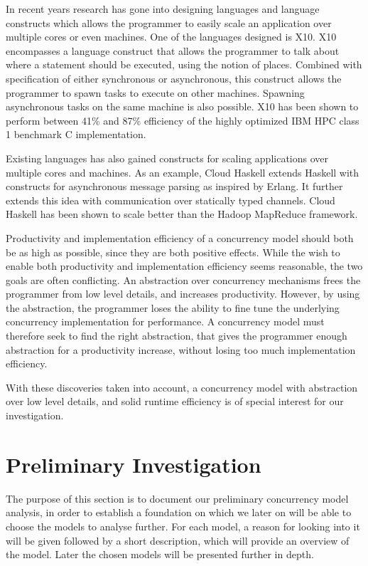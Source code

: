 In recent years research has gone into designing languages and language constructs which allows the programmer to easily scale an application over multiple cores or even machines. One of the languages designed is X10\cite{charles2005x10}. X10 encompasses a language construct that allows the programmer to talk about where a statement should be executed, using the notion of places\cite[p. 54]{tardieu2014x10}. Combined with specification of either synchronous or asynchronous, this construct allows the programmer to spawn tasks to execute on other machines. Spawning asynchronous tasks on the same machine is also possible\cite[p. 55]{tardieu2014x10}. X10 has been shown to perform between 41\% and 87\% efficiency of the highly optimized IBM HPC class 1 benchmark C implementation\cite[p. 62]{tardieu2014x10}.

Existing languages has also gained constructs for scaling applications over multiple cores and machines.  As an example, Cloud Haskell extends Haskell with constructs for asynchronous message parsing as inspired by Erlang\cite[p. 119]{epstein2011towards}. It further extends this idea with communication over statically typed channels\cite[p. 122]{epstein2011towards}. Cloud Haskell has been shown to scale better than the Hadoop MapReduce framework\cite[p. 128]{epstein2011towards}.

Productivity and implementation efficiency of a concurrency model should both be as high as possible, since they are both positive effects. While the wish to enable both productivity and implementation efficiency seems reasonable, the two goals are often conflicting. An abstraction over concurrency mechanisms frees the programmer from low level details, and increases productivity. However, by using the abstraction, the programmer loses the ability to fine tune the underlying concurrency implementation for performance. A concurrency model must therefore seek to find the right abstraction, that gives the programmer enough abstraction for a productivity increase, without losing too much implementation efficiency.

With these discoveries taken into account, a concurrency model with abstraction over low level details, and solid runtime efficiency is of special interest for our investigation.

\section{Preliminary Investigation}\label{sec:prelim}
The purpose of this section is to document our preliminary concurrency model analysis, in order to establish a foundation on which we later on will be able to choose the models to analyse further. For each model, a reason for looking into it will be given followed by a short description, which will provide an overview of the model. Later the chosen models will be presented further in depth.

